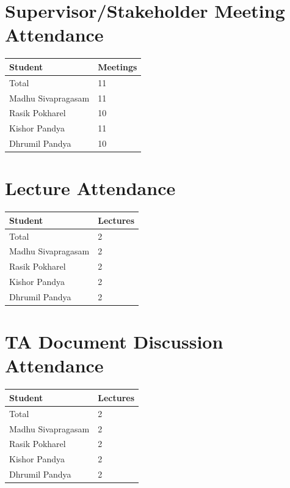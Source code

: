 \documentclass{article}
\begin{document}
\section{Supervisor/Stakeholder Meeting Attendance}



\begin{table}[H]
\centering
\begin{tabular}{ll}
\toprule
\textbf{Student} & \textbf{Meetings}\\
\midrule
Total & 11\\
Madhu Sivapragasam & 11\\
Rasik Pokharel & 10\\
Kishor Pandya & 11\\
Dhrumil Pandya & 10\\

\bottomrule
\end{tabular}
\end{table}



\section{Lecture Attendance}



\begin{table}[H]
\centering
\begin{tabular}{ll}
\toprule
\textbf{Student} & \textbf{Lectures}\\
\midrule
Total & 2\\
Madhu Sivapragasam &2\\
Rasik Pokharel & 2\\
Kishor Pandya & 2\\
Dhrumil Pandya & 2\\

\bottomrule
\end{tabular}
\end{table}


\section{TA Document Discussion Attendance}



\begin{table}[H]
\centering
\begin{tabular}{ll}
\toprule
\textbf{Student} & \textbf{Lectures}\\
\midrule
Total & 2\\
Madhu Sivapragasam &2\\
Rasik Pokharel & 2\\
Kishor Pandya & 2\\
Dhrumil Pandya & 2\\

\bottomrule
\end{tabular}
\end{table}
\end{document}
